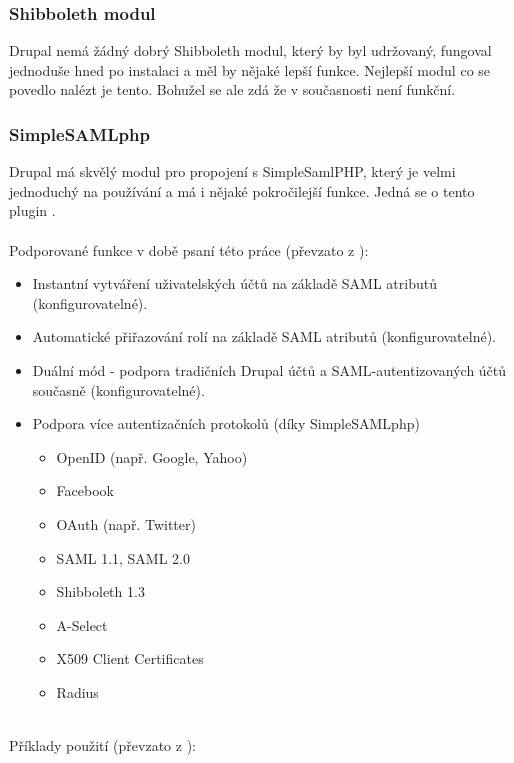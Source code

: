 \subsubsection{Shibboleth modul} %
    Drupal nemá žádný dobrý Shibboleth modul, který by byl udržovaný, fungoval jednoduše hned po instalaci a měl by nějaké lepší funkce. Nejlepší modul co se povedlo nalézt je tento\cite{basicshib}. Bohužel se ale zdá že v současnosti není funkční.
\subsubsection{SimpleSAMLphp} %
    Drupal má skvělý modul pro propojení s SimpleSamlPHP, který je velmi jednoduchý na používání a má i nějaké pokročilejší funkce. Jedná se o tento plugin \cite{SimpleSAMLphpDrupal}.
\\ 
\\
     Podporované funkce v době psaní této práce (převzato z \cite{SimpleSAMLphpDrupal}):
    \begin{itemize}
        \item Instantní vytváření uživatelských účtů na základě SAML atributů (konfigurovatelné).
        \item Automatické přiřazování rolí na základě SAML atributů (konfigurovatelné).
        \item Duální mód - podpora tradičních Drupal účtů a SAML-autentizovaných účtů současně (konfigurovatelné).
        \item  Podpora více autentizačních protokolů (díky SimpleSAMLphp)
        \begin{itemize}
            \item OpenID (např. Google, Yahoo)
            \item Facebook
            \item OAuth (např. Twitter)
            \item SAML 1.1, SAML 2.0
            \item Shibboleth 1.3
            \item A-Select
            \item X509 Client Certificates
            \item Radius
        \end{itemize}
    \end{itemize}
    \\
    Příklady použití (převzato z \cite{SimpleSAMLphpDrupal}):
